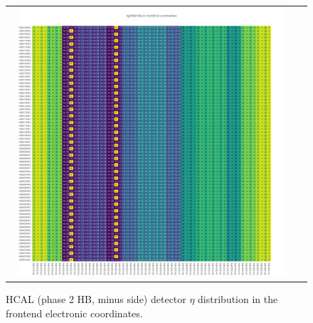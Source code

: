 \begin{figure}[htb]
 \begin{center}
  \begin{tabular}{cc}
   \includegraphics[angle=0,width=0.95\textwidth]{figures/appendix/ngHBM_Eta_in_FrontEnd.png}
  \end{tabular}
  \caption{HCAL (phase 2 HB, minus side) detector $\eta$ distribution in the frontend electronic coordinates.}
  \label{fig:lmapngHBMEtaFEC}
 \end{center}
\end{figure}
\clearpage

